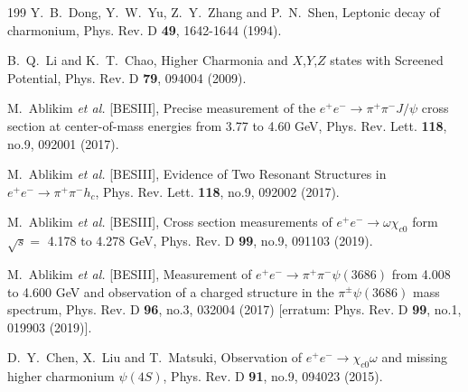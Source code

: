\documentclass[final,5p,times,twocolumn]{elsarticle}
\begin{document}
\begin{thebibliography}{199}
Y.~B.~Dong, Y.~W.~Yu, Z.~Y.~Zhang and P.~N.~Shen,
Leptonic decay of charmonium,
Phys. Rev. D \textbf{49}, 1642-1644 (1994).

B.~Q.~Li and K.~T.~Chao,
Higher Charmonia and $X$,$Y$,$Z$ states with Screened Potential,
Phys. Rev. D \textbf{79}, 094004 (2009).


M.~Ablikim \textit{et al.} [BESIII],
Precise measurement of the $e^+e^-\to \pi^+\pi^-J/\psi$ cross section at center-of-mass energies from 3.77 to 4.60 GeV,
Phys. Rev. Lett. \textbf{118}, no.9, 092001 (2017).


M.~Ablikim \textit{et al.} [BESIII],
Evidence of Two Resonant Structures in $e^+ e^- \to \pi^+ \pi^- h_c$,
Phys. Rev. Lett. \textbf{118}, no.9, 092002 (2017).


M.~Ablikim \textit{et al.} [BESIII],
Cross section measurements of $e^+ e^-\to\omega\chi_{c0}$ form $\sqrt{s}=$ 4.178 to 4.278 GeV,
Phys. Rev. D \textbf{99}, no.9, 091103 (2019).


M.~Ablikim \textit{et al.} [BESIII],
Measurement of $e^{+}e^{-}\rightarrow \pi^{+}\pi^{-}\psi(3686)$ from 4.008 to 4.600 GeV and observation of a charged structure in the $\pi^{\pm}\psi(3686)$ mass spectrum,
Phys. Rev. D \textbf{96}, no.3, 032004 (2017)
[erratum: Phys. Rev. D \textbf{99}, no.1, 019903 (2019)].


D.~Y.~Chen, X.~Liu and T.~Matsuki,
Observation of $e^+e^-\to \chi_{c0}\omega$ and missing higher charmonium $\psi(4S)$,
Phys. Rev. D \textbf{91}, no.9, 094023 (2015).


\end{thebibliography}
\end{document}
